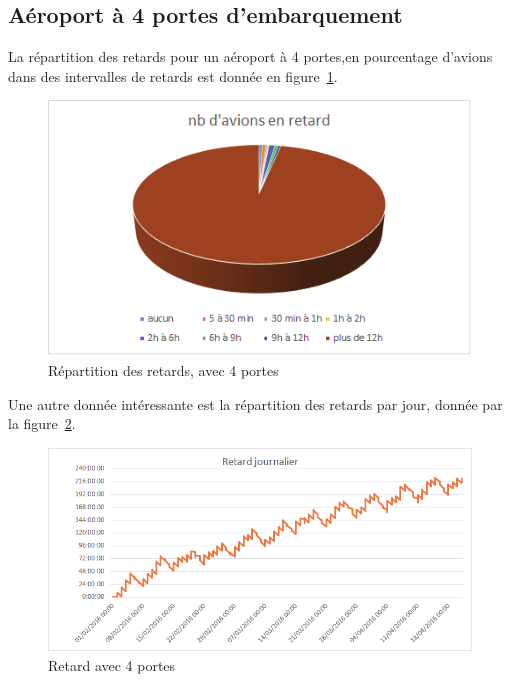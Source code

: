 \subsection{Aéroport à 4 portes d'embarquement}
La répartition des retards pour un aéroport à 4 portes,en pourcentage d'avions dans des intervalles de retards est donnée en figure~\ref{retard_camenbert_4}.
  \graphicspath{{donnees/graph_90jours/4portes/}}
\begin{figure}[H]
 \centering \includegraphics[scale=0.6]{retard_avions.png}
 \caption{\label{retard_camenbert_4} Répartition des retards, avec 4 portes} 
\end{figure}
 
Une autre donnée intéressante est la répartition des retards par jour, donnée par la figure~\ref{retard_jour_4}.
\begin{figure}[H]
\centering \includegraphics[scale=0.6]{retard_jours.png}
 \caption{\label{retard_jour_4} Retard avec 4 portes} 
\end{figure}
 
